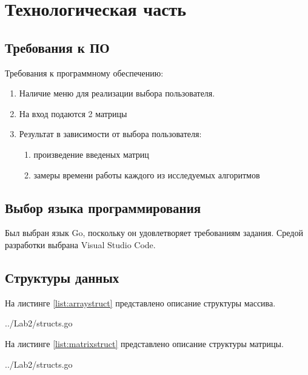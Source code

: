 
\chapter{Технологическая часть}\label{tecnology}

\section{Требования к ПО}\label{Requirements}

Требования к программному обеспечению:
\begin{enumerate}
    \item Наличие меню для реализации выбора пользователя.
    \item На вход подаются 2 матрицы
    \item Результат в зависимости от выбора пользователя:
    \begin{enumerate}
        \item произведение введеных матриц
        \item замеры времени работы каждого из исследуемых алгоритмов
    \end{enumerate}
\end{enumerate}

\section{Выбор языка программирования}\label{Requirements}

Был выбран язык Go, поскольку он удовлетворяет требованиям задания. Средой разработки выбрана Visual Studio Code.

\section{Структуры данных}\label{StructsList}

На листинге \ref{list:arraystruct} представлено описание структуры массива.

\begin{lstinputlisting}
    [caption = {Структура массива},
    label = {list:arraystruct},
    linerange={5-8},
    ]{../Lab2/structs.go}
\end{lstinputlisting}

На листинге \ref{list:matrixstruct} представлено описание структуры матрицы.

\begin{lstinputlisting}
    [caption = {Структура матрицы},
    label = {list:matrixstruct},
    linerange={9-13},
    ]{../Lab2/structs.go}
\end{lstinputlisting}\label{list:structmatrix}

